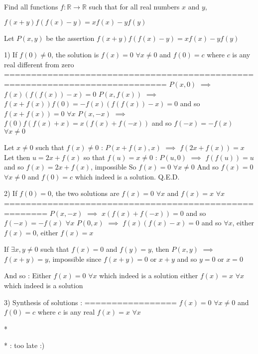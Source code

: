 \begin{solution}
	\begin{tcolorbox}Find all functions $f:\mathbb R \longrightarrow \mathbb R$ such that for all real numbers $x$ and $y$,

$f(x+y)f(f(x)-y)=xf(x)-yf(y)$\end{tcolorbox}
Let $P(x,y)$ be the assertion $f(x+y)f(f(x)-y)=xf(x)-yf(y)$

1) If $f(0)\ne 0$, the solution is $f(x)=0$ $\forall x\ne 0$ and $f(0)=c$ where $c$ is any real different from zero
============================================================================
$P(x,0)$ $\implies$ $f(x)(f(f(x))-x)=0$
$P(x,f(x))$ $\implies$ $f(x+f(x))f(0)=-f(x)(f(f(x))-x)=0$ and so $f(x+f(x))=0$ $\forall x$
$P(x,-x)$ $\implies$ $f(0)f(f(x)+x)=x(f(x)+f(-x))$ and so $f(-x)=-f(x)$ $\forall x\ne 0$

Let $x\ne 0$ such that $f(x)\ne 0$ : $P(x+f(x),x)$ $\implies$ $f(2x+f(x))=x$
Let then $u=2x+f(x)$ so that $f(u)=x\ne 0$ : $P(u,0)$ $\implies$ $f(f(u))=u$ and so $f(x)=2x+f(x)$, impossible
So $f(x)=0$ $\forall x\ne 0$
And so $f(x)=0$ $\forall x\ne 0$ and $f(0)=c$ which indeed is a solution.
Q.E.D.

2) If $f(0)=0$, the two solutions are $f(x)=0$ $\forall x$ and $f(x)=x$ $\forall x$
======================================================
$P(x,-x)$ $\implies$ $x(f(x)+f(-x))=0$ and so $f(-x)=-f(x)$ $\forall x$
$P(0,x)$ $\implies$ $f(x)(f(x)-x)=0$ and so $\forall x$, either $f(x)=0$, either $f(x)=x$

If $\exists x,y\ne 0$ such that $f(x)=0$ and $f(y)=y$, then $P(x,y)$ $\implies$ $f(x+y)=y$, impossible since $f(x+y)=0$ or $x+y$ and so $y=0$ or $x=0$

And so :
Either $f(x)=0$ $\forall x$ which indeed is a solution
either $f(x)=x$ $\forall x$ which indeed is a solution

3) Synthesis of solutions :
=================
$f(x)=0$ $\forall x\ne 0$ and $f(0)=c$ where $c$ is any real
$f(x)=x$ $\forall x$


** : too late :)
\end{solution}




